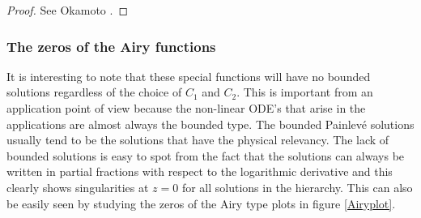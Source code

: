 \documentclass[12pt]{article}
\def\P{Painlev\'e }
\numberwithin{figure}{section}
\numberwithin{equation}{section}
\numberwithin{table}{section}
\begin{document}
\begin{proof}
See Okamoto \cite{P:275:221}.
\end{proof}
\subsubsection{The zeros of the Airy functions}
It is interesting to note that these special functions will have no bounded solutions regardless of the choice of $C_1$ and $C_2$. This is important from an application point of view because the non-linear ODE's that arise in the applications are almost always the bounded type. The bounded \P solutions usually tend to be the solutions that have the physical relevancy. The lack of bounded solutions is easy to spot from the fact that the solutions can always be written in partial fractions with respect to the logarithmic derivative and this clearly shows singularities at $z=0$ for all solutions in the hierarchy. This can also be easily seen by studying the zeros of the Airy type plots in figure \ref{Airyplot}.
\end{document}
